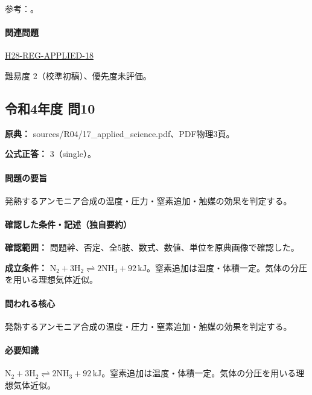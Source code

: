 \par 参考：\cite{iupac_greenbook2012}。

\paragraph{関連問題} \hyperref[q:h28-reg-applied-18]{H28-REG-APPLIED-18}

\par 難易度 2（校準初稿）、優先度未評価。

\subsection{令和4年度 問10}
\label{q:r04-reg-applied-10}

\noindent\textbf{原典：} sources/R04/17\_applied\_science.pdf、PDF物理3頁。

\textbf{公式正答：} 3（single）。

\paragraph{問題の要旨} 発熱するアンモニア合成の温度・圧力・窒素追加・触媒の効果を判定する。

\paragraph{確認した条件・記述（独自要約）}\mbox{}\par

\noindent\textbf{確認範囲：} 問題幹、否定、全5肢、数式、数値、単位を原典画像で確認した。\par

\noindent\textbf{成立条件：} \(\mathrm{N_2+3H_2\rightleftharpoons2NH_3}+92\,\mathrm{kJ}\)。窒素追加は温度・体積一定。気体の分圧を用いる理想気体近似。\par

\paragraph{問われる核心} 発熱するアンモニア合成の温度・圧力・窒素追加・触媒の効果を判定する。

\paragraph{必要知識} \(\mathrm{N_2+3H_2\rightleftharpoons2NH_3}+92\,\mathrm{kJ}\)。窒素追加は温度・体積一定。気体の分圧を用いる理想気体近似。

